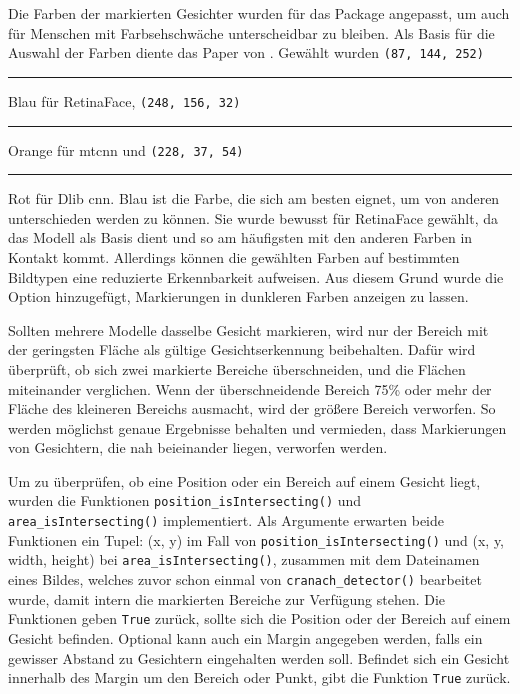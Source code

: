 Die Farben der markierten Gesichter wurden für das Package angepasst, um auch für Menschen mit Farbsehschwäche unterscheidbar zu bleiben. Als Basis für die Auswahl der Farben diente das Paper von \cite{abs-2107-02270}. Gewählt wurden \texttt{(87, 144, 252)} \textcolor{PetroffBlue}{\rule{1em}{1em}} Blau für RetinaFace, \texttt{(248, 156, 32)} \textcolor{PetroffOrange}{\rule{1em}{1em}} Orange für \gls{mtcnn} und \texttt{(228, 37, 54)} \textcolor{PetroffRed}{\rule{1em}{1em}} Rot für Dlib \gls{cnn}. Blau ist die Farbe, die sich am besten eignet, um von anderen unterschieden werden zu können. Sie wurde bewusst für RetinaFace gewählt, da das Modell als Basis dient und so am häufigsten mit den anderen Farben in Kontakt kommt. Allerdings können die gewählten Farben auf bestimmten Bildtypen eine reduzierte Erkennbarkeit aufweisen. Aus diesem Grund wurde die Option hinzugefügt, Markierungen in dunkleren Farben anzeigen zu lassen.

Sollten mehrere Modelle dasselbe Gesicht markieren, wird nur der Bereich mit der geringsten Fläche als gültige Gesichtserkennung beibehalten. Dafür wird überprüft, ob sich zwei markierte Bereiche überschneiden, und die Flächen miteinander verglichen. Wenn der überschneidende Bereich 75\% oder mehr der Fläche des kleineren Bereichs ausmacht, wird der größere Bereich verworfen. So werden möglichst genaue Ergebnisse behalten und vermieden, dass Markierungen von Gesichtern, die nah beieinander liegen, verworfen werden.

Um zu überprüfen, ob eine Position oder ein Bereich auf einem Gesicht liegt, wurden die Funktionen \texttt{position\_isIntersecting()} und \texttt{area\_isIntersecting()} implementiert. Als Argumente erwarten beide Funktionen ein Tupel: (x, y) im Fall von \texttt{position\_isIntersecting()} und (x, y, width, height) bei \texttt{area\_isIntersecting()}, zusammen mit dem Dateinamen eines Bildes, welches zuvor schon einmal von \texttt{cranach\_detector()} bearbeitet wurde, damit intern die markierten Bereiche zur Verfügung stehen. Die Funktionen geben \texttt{True} zurück, sollte sich die Position oder der Bereich auf einem Gesicht befinden.  
Optional kann auch ein Margin angegeben werden, falls ein gewisser Abstand zu Gesichtern eingehalten werden soll. Befindet sich ein Gesicht innerhalb des Margin um den Bereich oder Punkt, gibt die Funktion \texttt{True} zurück.
